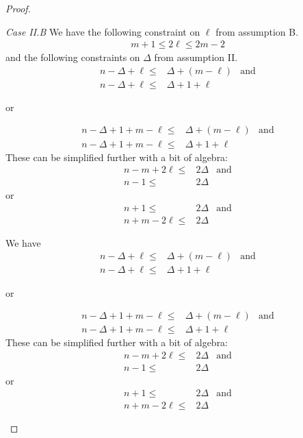 \begin{proof}
\begin{proofpart}
  \textit{Case II.B}  We have the following constraint on $\ell$ from
  assumption B.
  \begin{align*}
   m + 1 \leq 2 \ell \leq 2m - 2
  \end{align*}
  and the following constraints on $\Delta$ from assumption II.
  \begin{align*}
   n - \Delta + \ell \leq & \Delta + (m - \ell) & \text{and} \\
   n - \Delta + \ell \leq & \Delta + 1 + \ell
  \end{align*}
  \begin{center}or\end{center}
  \begin{align*}
   n - \Delta + 1 + m - \ell \leq & \Delta + (m - \ell) & \text{and} \\
   n - \Delta + 1 + m - \ell \leq & \Delta + 1 + \ell
  \end{align*}
  These can be simplified further with a bit of algebra:
  \begin{align*}
   n-m+2\ell \leq & 2 \Delta & \text{and} \\
   n-1 \leq       & 2\Delta
  \end{align*}
  or
  \begin{align*}
   n+1 \leq        & 2 \Delta & \text{and} \\
   n+m-2\ell  \leq & 2 \Delta
  \end{align*}

  We have
  \begin{align*}
   n - \Delta + \ell \leq & \Delta + (m - \ell) & \text{and} \\
   n - \Delta + \ell \leq & \Delta + 1 + \ell
  \end{align*}
  \begin{center}or\end{center}
  \begin{align*}
   n - \Delta + 1 + m - \ell \leq & \Delta + (m - \ell) & \text{and} \\
   n - \Delta + 1 + m - \ell \leq & \Delta + 1 + \ell
  \end{align*}
  These can be simplified further with a bit of algebra:
  \begin{align*}
   n-m+2\ell \leq & 2 \Delta & \text{and} \\
   n-1 \leq       & 2\Delta
  \end{align*}
  or
  \begin{align*}
   n+1 \leq        & 2 \Delta & \text{and} \\
   n+m-2\ell  \leq & 2 \Delta
  \end{align*}


\end{proofpart}
\end{proof}
